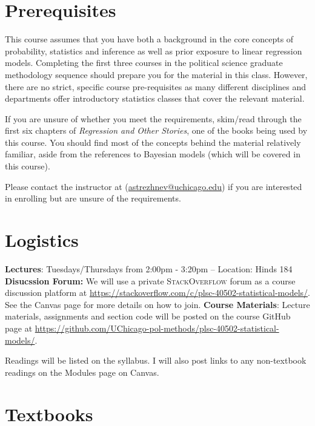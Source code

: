\documentclass[11pt, article, oneside]{memoir}
\theoremstyle{Assumption}
\begin{document}
\section*{Prerequisites}

This course assumes that you have both a background in the core concepts of probability, statistics and inference as well as prior exposure to linear regression models. Completing the first three courses in the political science graduate methodology sequence should prepare you for the material in this class. However, there are no strict, specific course pre-requisites as many different disciplines and departments offer introductory statistics classes that cover the relevant material.

If you are unsure of whether you meet the requirements, skim/read through the first six chapters of \textit{Regression and Other Stories}, one of the books being used by this course. You should find most of the concepts behind the material relatively familiar, aside from the references to Bayesian models (which will be covered in this course).

Please contact the instructor at (\href{mailto:astrezhnev@uchicago.edu}{astrezhnev@uchicago.edu}) if you are interested in enrolling but are unsure of the requirements. 

\section*{Logistics}

\textbf{Lectures}: Tuesdays/Thursdays from 2:00pm - 3:20pm -- Location: Hinds 184
\newline\newline \textbf{Disucssion Forum:} We will use a private \textsc{StackOverflow} forum as a course discussion platform at \url{https://stackoverflow.com/c/plsc-40502-statistical-models/}. See the Canvas page for more details on how to join.
\newline\newline\textbf{Course Materials}: Lecture materials, assignments and section code will be posted on the course GitHub page at \url{https://github.com/UChicago-pol-methods/plsc-40502-statistical-models/}.

Readings will be listed on the syllabus. I will also post links to any non-textbook readings on the Modules page on Canvas.

\section*{Textbooks} 
\end{document}
